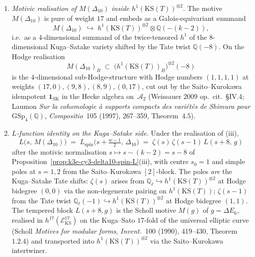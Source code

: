 \begin{theorem}
\begin{enumerate}[label=\textup{(\roman*)},leftmargin=1.5em]
 \[
 \dim \mathrm{KS}(T) \;=\; 2^{\dim T - 2} \;=\; 2^{5 - 2} \;=\; 8,
 \]
 the exponent $\dim T - 2 = n - 2$ arising from the dimension $2^{n-1}$ of the even Clifford module further halved by the polarisation \textup{(}Deligne \emph{loc.\ cit.}\ Prop.\ 4.5\textup{)}. The integer $8$ is the correct Kuga--Satake dimension; the naive product $2^{g-1} \cdot 2^g$ does not compute $\dim \mathrm{KS}$, since $2^{g-1}$ and $2^g$ are ranks of the two Clifford parity summands $C^\pm(T)$ (a direct sum, not a tensor product).
 \item \emph{Motivic realisation of $M(\Delta_{10})$ inside $h^1(\mathrm{KS}(T))^{\otimes 2}$.} The motive $M(\Delta_{10})$ is pure of weight $17$ and embeds as a Galois-equivariant summand
 \[
 M(\Delta_{10}) \;\hookrightarrow\; h^1(\mathrm{KS}(T))^{\otimes 2} \otimes \mathbb Q(-(k-2)),
 \]
 i.e.\ as a $4$-dimensional summand of the twice-tensored $h^1$ of the $8$-dimensional Kuga--Satake variety shifted by the Tate twist $\mathbb Q(-8)$. On the Hodge realisation
 \[
 M(\Delta_{10})_B \;\subset\; \bigl(h^1(\mathrm{KS}(T))_B\bigr)^{\otimes 2}(-8)
 \]
 is the $4$-dimensional sub-Hodge-structure with Hodge numbers $(1, 1, 1, 1)$ at weights $(17, 0), (9, 8), (8, 9), (0, 17)$, cut out by the Saito--Kurokawa idempotent $\mathbf{1}_{\mathrm{SK}}$ in the Hecke algebra on~$\mathcal A_2$ \textup{(}Weissauer 2009 op.\ cit.\ \S IV.$4$; Laumon \emph{Sur la cohomologie \`a supports compacts des vari\'et\'es de Shimura pour $\mathrm{GSp}_4(\mathbb Q)$}, \emph{Compositio}\ 105 (1997), 267--359, Theorem~$4.5$\textup{)}.
 \item \emph{$L$-function identity on the Kuga--Satake side.} Under the realisation of (iii),
 \[
 L\bigl(s,\, M(\Delta_{10})\bigr) \;=\; L_{\mathrm{spin}}\bigl(s + \tfrac{w-1}{2},\, \Delta_{10}\bigr)
 \;=\; \zeta(s)\, \zeta(s - 1)\, L(s + 8,\, g)
 \]
 after the motivic normalisation $s \mapsto s - (k-2) = s - 8$ of Proposition~\ref{prop:k3e-cy3-delta10-spin-L}(iii), with centre $s_0 = 1$ and simple poles at $s = 1, 2$ from the Saito--Kurokawa $[2]$-block. The poles \emph{are} the Kuga--Satake Tate shifts: $\zeta(s)$ arises from $\mathbb Q_\ell \hookrightarrow h^1(\mathrm{KS}(T))^{\otimes 2}$ at Hodge bidegree $(0,0)$ via the non-degenerate pairing on $h^1(\mathrm{KS}(T))$; $\zeta(s-1)$ from the Tate twist $\mathbb Q_\ell(-1) \hookrightarrow h^1(\mathrm{KS}(T))^{\otimes 2}$ at Hodge bidegree $(1,1)$. The tempered block $L(s+8, g)$ is the Scholl motive $M(g)$ of $g = \Delta E_6$, realised in $h^{17}(\mathcal E^{17}_{\mathrm{KS}})$ on the Kuga--Sato $17$-fold of the universal elliptic curve \textup{(}Scholl \emph{Motives for modular forms}, \emph{Invent.}\ 100 (1990), 419--430, Theorem~$1.2.4$\textup{)} and transported into $h^1(\mathrm{KS}(T))^{\otimes 2}$ via the Saito--Kurokawa intertwiner.
\end{enumerate}
\end{theorem}

